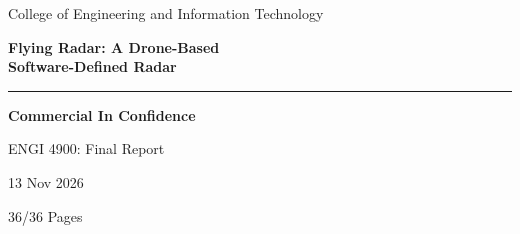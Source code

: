 \documentclass[11pt,a4paper]{report}
\newif\ifPrismFrontMatter
\begin{document}
\pagestyle{commercialconfidential}

\ifPrismFrontMatter
{}

\begin{titlepage}
\centering
\thispagestyle{empty}

\vspace*{0.28cm}

\vspace{0.55cm}

{\Large College of Engineering and Information Technology\par}
\vspace{0.85cm}

{\LARGE\bfseries Flying Radar: A Drone-Based\\[0.3em]
Software-Defined Radar \par}
\vspace{0.52cm}

\noindent\rule{0.83\textwidth}{0.6pt}
\vspace{0.95cm}

{\Large\bfseries\textcolor{red!70!black}{Commercial In Confidence}\par}
\vspace{0.65cm}

{\Large ENGI 4900: Final Report\par}
\vspace{0.75cm}


\vspace{0.35cm}


{\large 13 Nov 2026\par}
36/36 Pages


\end{titlepage}
\end{document}
